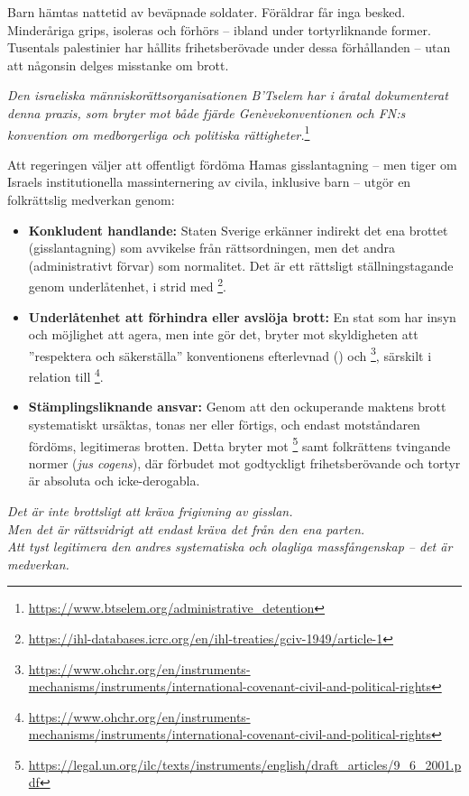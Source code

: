 Barn hämtas nattetid av beväpnade soldater. Föräldrar får inga besked. Minderåriga grips, isoleras och förhörs – ibland under tortyrliknande former. Tusentals palestinier har hållits frihetsberövade under dessa förhållanden – utan att någonsin delges misstanke om brott.

\textit{Den israeliska människorättsorganisationen B’Tselem har i åratal dokumenterat denna praxis, som bryter mot både fjärde Genèvekonventionen och FN:s konvention om medborgerliga och politiska rättigheter.}\footnote{\url{https://www.btselem.org/administrative_detention}}

Att regeringen väljer att offentligt fördöma Hamas gisslantagning – men tiger om Israels institutionella massinternering av civila, inklusive barn – utgör en folkrättslig medverkan genom:

\begin{itemize}
  \item \textbf{Konkludent handlande:} Staten Sverige erkänner indirekt det ena brottet (gisslantagning) som avvikelse från rättsordningen, men det andra (administrativt förvar) som normalitet. Det är ett rättsligt ställningstagande genom underlåtenhet, i strid med \footnote{\url{https://ihl-databases.icrc.org/en/ihl-treaties/gciv-1949/article-1}}.

  \item \textbf{Underlåtenhet att förhindra eller avslöja brott:} En stat som har insyn och möjlighet att agera, men inte gör det, bryter mot skyldigheten att ”respektera och säkerställa” konventionens efterlevnad () och \footnote{\url{https://www.ohchr.org/en/instruments-mechanisms/instruments/international-covenant-civil-and-political-rights}}, särskilt i relation till \footnote{\url{https://www.ohchr.org/en/instruments-mechanisms/instruments/international-covenant-civil-and-political-rights}}.

  \item \textbf{Stämplingsliknande ansvar:} Genom att den ockuperande maktens brott systematiskt ursäktas, tonas ner eller förtigs, och endast motståndaren fördöms, legitimeras brotten. Detta bryter mot \footnote{\url{https://legal.un.org/ilc/texts/instruments/english/draft_articles/9_6_2001.pdf}} samt folkrättens tvingande normer (\textit{jus cogens}), där förbudet mot godtyckligt frihetsberövande och tortyr är absoluta och icke-derogabla.
\end{itemize}

\textit{Det är inte brottsligt att kräva frigivning av gisslan.}\\
\textit{Men det är rättsvidrigt att endast kräva det från den ena parten.}\\
\textit{Att tyst legitimera den andres systematiska och olagliga massfångenskap – det är medverkan.}



